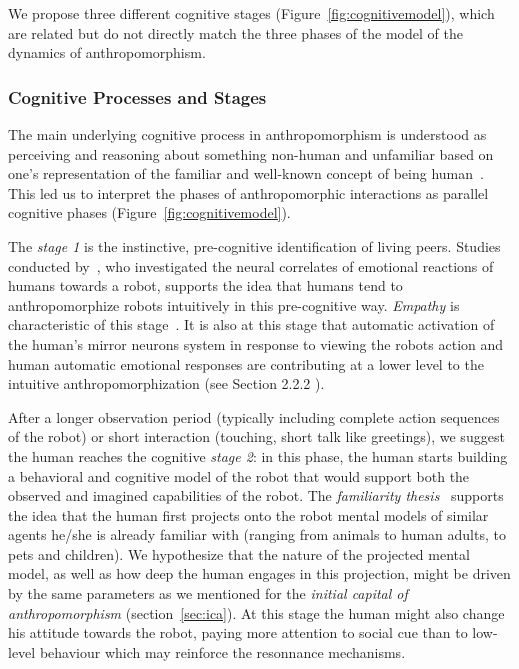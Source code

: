 \documentclass{frontiersSCNS} %
\begin{document}
We propose three different cognitive stages (Figure~\ref{fig:cognitivemodel}),
which are related but do not directly match the three phases of
the model of the dynamics of anthropomorphism.


\subsubsection{Cognitive Processes and Stages}

The main underlying cognitive process in anthropomorphism is understood as
perceiving and reasoning about something non-human and unfamiliar based on one's
representation of the familiar and well-known concept of being
human~\citep{epley_when_2008}. This led us to interpret the phases of
anthropomorphic interactions as parallel cognitive phases
(Figure~\ref{fig:cognitivemodel}).

The \emph{stage 1} is the instinctive, pre-cognitive identification of living
peers. Studies conducted by~\citet{rosenthal-vonderputten_experimental_2013},
who investigated the neural correlates of emotional reactions of humans towards
a robot, supports the idea that humans tend to anthropomorphize robots
intuitively in this pre-cognitive way. {\it Empathy} is characteristic of this
stage~\citep{rosenthalvonderPutten2013neural}.  It is also at this stage that
automatic activation of the human's mirror neurons system  in response to
viewing the robots action and human automatic emotional responses are
contributing at a lower level to the intuitive anthropomorphization (see Section
2.2.2 ).




After a longer observation period (typically including complete action sequences
of the robot) or short interaction (touching, short talk like greetings), we
suggest the human reaches the cognitive \emph{stage 2}: in this phase, the human
starts building a behavioral and cognitive model of the robot that would support
both the observed and imagined capabilities of the robot.  The \emph{familiarity
thesis}~\cite{hegel_understanding_2008} supports the idea that the human first
projects onto the robot mental models of similar agents he/she is already
familiar with (ranging from animals to human adults, to pets and children). We
hypothesize that the nature of the projected mental model, as well as how deep
the human engages in this projection, might be driven by the same parameters as
we mentioned for the \emph{initial capital of anthropomorphism}
(section~\ref{sec:ica}).  At this stage the human might also change his attitude
towards the robot, paying more attention to social cue than to low-level
behaviour which may reinforce the resonnance mechanisms. 
\end{document}
